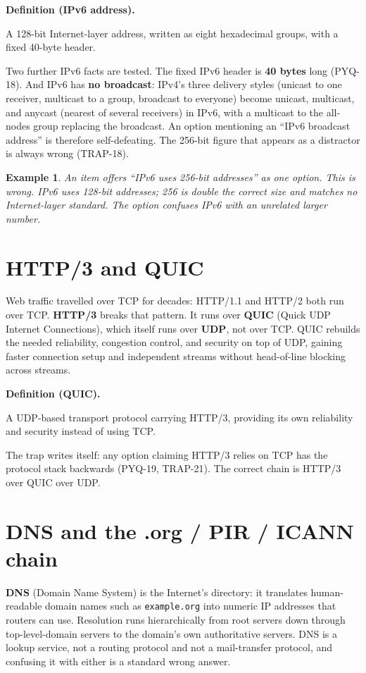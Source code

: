 \documentclass[11pt]{article}
\newtheorem{example}{Example}[section]
\newenvironment{definitionbox}[1]{%
  \par\noindent\textbf{Definition (#1).}\ \itshape
}{\par\vspace{0.3em}}
\begin{document}
\begin{definitionbox}{IPv6 address}
A 128-bit Internet-layer address, written as eight hexadecimal groups, with a
fixed 40-byte header.
\end{definitionbox}

Two further IPv6 facts are tested. The fixed IPv6 header is \textbf{40 bytes}
long (PYQ-18). And IPv6 has \textbf{no broadcast}: IPv4's three delivery
styles (unicast to one receiver, multicast to a group, broadcast to everyone)
become unicast, multicast, and anycast (nearest of several receivers) in
IPv6, with a multicast to the all-nodes group replacing the broadcast. An
option mentioning an ``IPv6 broadcast address'' is therefore self-defeating.
The 256-bit figure that appears as a distractor is always wrong (TRAP-18).

\begin{example}
An item offers ``IPv6 uses 256-bit addresses'' as one option. This is wrong.
IPv6 uses 128-bit addresses; 256 is double the correct size and matches no
Internet-layer standard. The option confuses IPv6 with an unrelated larger
number.
\end{example}

\section{HTTP/3 and QUIC}
Web traffic travelled over TCP for decades: HTTP/1.1 and HTTP/2 both run
over TCP. \textbf{HTTP/3} breaks that pattern. It runs over \textbf{QUIC}
(Quick UDP Internet Connections), which itself runs over \textbf{UDP}, not
over TCP. QUIC rebuilds the needed reliability, congestion control, and
security on top of UDP, gaining faster connection setup and independent
streams without head-of-line blocking across streams.

\begin{definitionbox}{QUIC}
A UDP-based transport protocol carrying HTTP/3, providing its own reliability
and security instead of using TCP.
\end{definitionbox}

The trap writes itself: any option claiming HTTP/3 relies on TCP has the
protocol stack backwards (PYQ-19, TRAP-21). The correct chain is HTTP/3 over
QUIC over UDP.

\section{DNS and the .org / PIR / ICANN chain}
\textbf{DNS} (Domain Name System) is the Internet's directory: it translates
human-readable domain names such as \texttt{example.org} into numeric IP
addresses that routers can use. Resolution runs hierarchically from root
servers down through top-level-domain servers to the domain's own
authoritative servers. DNS is a lookup service, not a routing protocol and
not a mail-transfer protocol, and confusing it with either is a standard
wrong answer.
\end{document}
